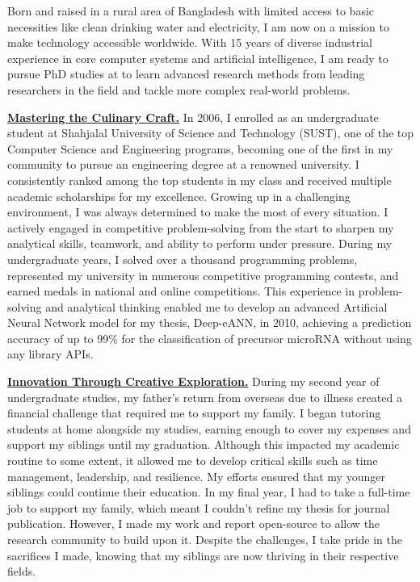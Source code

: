 
Born and raised in a rural area of Bangladesh with limited access to basic necessities like clean drinking water and electricity,
I am now on a mission to make technology accessible worldwide.
With 15 years of diverse industrial experience in core computer systems and artificial intelligence,
I am ready to pursue PhD studies at \GetUniversityName to learn advanced research methods from leading researchers in the field
and tackle more complex real-world problems.


\textbf{\underline{Mastering the Culinary Craft.}}
In 2006, I enrolled as an undergraduate student at Shahjalal University of Science and Technology (SUST),
one of the top Computer Science and Engineering programs, becoming one of the first in my community
to pursue an engineering degree at a renowned university.
I consistently ranked among the top students in my class and received multiple academic scholarships for my excellence.
Growing up in a challenging environment, I was always determined to make the most of every situation.
I actively engaged in competitive problem-solving from the start to sharpen my analytical skills, teamwork,
and ability to perform under pressure.
During my undergraduate years, I solved over a thousand programming problems, represented my university
in numerous competitive programming contests, and earned medals in national and online competitions.
This experience in problem-solving and analytical thinking enabled me to develop an advanced Artificial Neural Network
model for my thesis, Deep-eANN, in 2010, achieving a prediction accuracy of up to 99\% for the classification
of precursor microRNA without using any library APIs.


\textbf{\underline{Innovation Through Creative Exploration.}}
During my second year of undergraduate studies, my father’s return from overseas due to illness
created a financial challenge that required me to support my family.
I began tutoring students at home alongside my studies, earning enough to cover my expenses
and support my siblings until my graduation.
Although this impacted my academic routine to some extent, it allowed me to develop critical skills
such as time management, leadership, and resilience.
My efforts ensured that my younger siblings could continue their education.
In my final year, I had to take a full-time job to support my family, which meant I couldn't refine my thesis
for journal publication.
However, I made my work and report open-source to allow the research community to build upon it.
Despite the challenges, I take pride in the sacrifices I made, knowing that my siblings are now thriving
in their respective fields.


